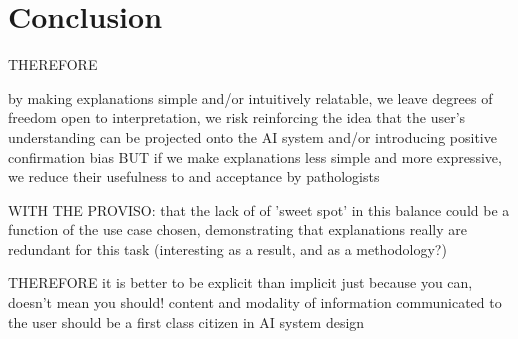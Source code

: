 

\section{Conclusion}

THEREFORE

by making explanations simple and/or intuitively relatable, we leave degrees of freedom open to interpretation, we risk reinforcing the idea that the user's understanding can be projected onto the AI system and/or introducing positive confirmation bias 
BUT
if we make explanations less simple and more expressive, we reduce their usefulness to and acceptance by pathologists

WITH THE PROVISO: that the lack of of 'sweet spot' in this balance could be a function of the use case chosen, demonstrating that explanations really are redundant for this task (interesting as a result, and as a methodology?)

THEREFORE
it is better to be explicit than implicit
just because you can, doesn't mean you should!
content and modality of information communicated to the user should be a first class citizen in AI system design


